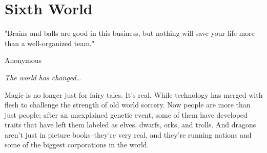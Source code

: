 \documentclass[main]{subfiles}
\begin{document}
\section{Sixth World}
\epigraph{"Brains and balls are good in this business, but nothing will save
  your life more than a well-organized team."}{Anonymous}
\textit{The world has changed…}


Magic is no longer just for fairy tales. It’s real. While technology has merged with flesh to challenge the strength of old world sorcery. Now people are more than just people; after an unexplained genetic event, some of them have developed traits that have left them labeled as elves, dwarfs, orks, and trolls. And dragons aren’t just in picture books–they’re very real, and they’re running nations and some of the biggest corporations in the world.
\end{document}

